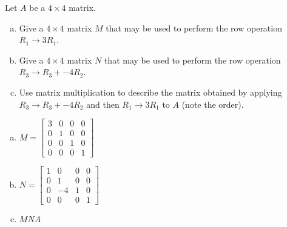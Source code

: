 
\begin{exerciseStatement}


Let \(A\) be a \(4 \times 4\) matrix.


\begin{enumerate}[(a)]
\item Give a \(4 \times 4\) matrix \(M\) that may be used to perform the row operation \( R_1 \to 3R_1 \).
\item Give a \(4 \times 4\) matrix \(N\) that may be used to perform the row operation \( R_3 \to R_3 + -4R_2 \).
\item Use matrix multiplication to describe the matrix obtained by applying \( R_3 \to R_3 + -4R_2 \) and then \( R_1 \to 3R_1 \) to \(A\) (note the order). 
\end{enumerate}
    
\end{exerciseStatement}
    
\begin{exerciseAnswer} 

\begin{enumerate}[(a)]
\item \(M= \left[\begin{array}{cccc}
3 & 0 & 0 & 0 \\
0 & 1 & 0 & 0 \\
0 & 0 & 1 & 0 \\
0 & 0 & 0 & 1
\end{array}\right] \)
\item \(N= \left[\begin{array}{cccc}
1 & 0 & 0 & 0 \\
0 & 1 & 0 & 0 \\
0 & -4 & 1 & 0 \\
0 & 0 & 0 & 1
\end{array}\right] \)
\item \(MNA\)
\end{enumerate}
    
\end{exerciseAnswer}
    
